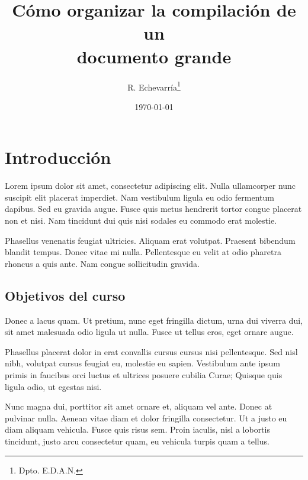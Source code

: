 \documentclass[12pt,a4paper]{report}
\title{Cómo organizar la compilación de un \\ documento grande}
\author{R. Echevarría\thanks{Dpto. E.D.A.N.}}
\date{\today}
\begin{document}



\maketitle 



{\setlength{\parskip}{0pt}
\tableofcontents
}





\chapter{Introducción}
\label{tema.introduccion}



Lorem ipsum dolor sit amet, consectetur adipiscing elit. Nulla ullamcorper nunc suscipit elit placerat imperdiet. Nam vestibulum ligula eu odio fermentum dapibus. Sed eu gravida augue. Fusce quis metus hendrerit tortor congue placerat non et nisi. Nam tincidunt dui quis nisi sodales eu commodo erat molestie. 

Phasellus venenatis feugiat ultricies. Aliquam erat volutpat. Praesent bibendum blandit tempus. Donec vitae mi nulla. Pellentesque eu velit at odio pharetra rhoncus a quis ante. Nam congue sollicitudin gravida. 





\section{Objetivos del curso}
\label{seccion.objetivos}


Donec a lacus quam. Ut pretium, nunc eget fringilla dictum, urna dui viverra dui, sit amet malesuada odio ligula ut nulla. Fusce ut tellus eros, eget ornare augue.

Phasellus placerat dolor in erat convallis cursus cursus nisi pellentesque. Sed nisl nibh, volutpat cursus feugiat eu, molestie eu sapien. Vestibulum ante ipsum primis in faucibus orci luctus et ultrices posuere cubilia Curae; Quisque quis ligula odio, ut egestas nisi. 

Nunc magna dui, porttitor sit amet ornare et, aliquam vel ante. Donec at pulvinar nulla. Aenean vitae diam et dolor fringilla consectetur. Ut a justo eu diam aliquam vehicula. Fusce quis risus sem. Proin iaculis, nisl a lobortis tincidunt, justo arcu consectetur quam, eu vehicula turpis quam a tellus.
\end{document}
